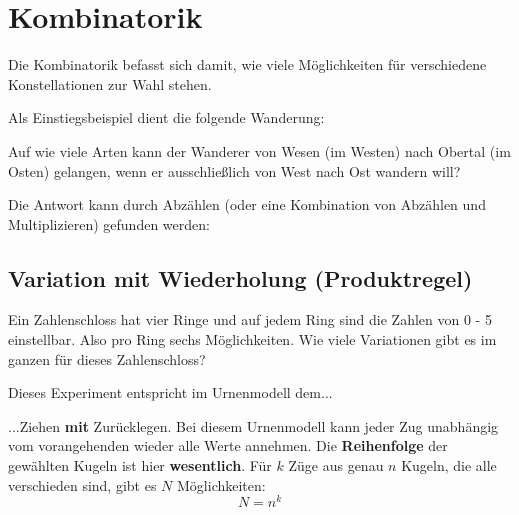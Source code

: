 
\section{Kombinatorik}
Die Kombinatorik befasst sich damit, wie viele Möglichkeiten für
verschiedene Konstellationen zur Wahl stehen.

Als Einstiegsbeispiel dient die folgende Wanderung:

\vspace{5mm}


Auf wie viele Arten kann der Wanderer von Wesen (im Westen) nach Obertal (im Osten) gelangen, wenn er ausschließlich von West nach Ost wandern will?

Die Antwort kann durch Abzählen (oder eine Kombination von Abzählen und Multiplizieren) gefunden werden:


\newpage
\subsection{Variation mit Wiederholung (Produktregel)}
Ein Zahlenschloss hat vier Ringe und auf jedem Ring sind die Zahlen
von 0 - 5 einstellbar. Also pro Ring sechs Möglichkeiten.
Wie viele Variationen gibt es im ganzen für dieses Zahlenschloss?



Dieses Experiment entspricht im Urnenmodell dem...
\begin{gesetz}{...Ziehen \textbf{mit} Zurücklegen.}{}
Bei diesem Urnenmodell kann jeder Zug unabhängig vom
vorangehenden wieder alle Werte annehmen. Die \textbf{Reihenfolge} der gewählten Kugeln ist hier \textbf{wesentlich}. Für $k$ Züge aus genau $n$
Kugeln, die alle verschieden sind, gibt es $N$ Möglichkeiten:
$$N = n^k$$
\end{gesetz}

